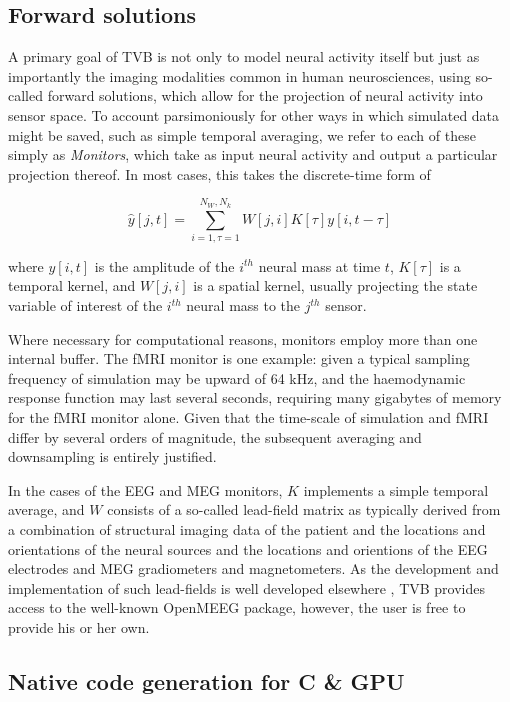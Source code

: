 \subsection{Forward solutions}

    A primary goal of TVB is not only to model neural activity itself
    but just as importantly the imaging modalities common in human 
    neurosciences, using so-called forward solutions, which allow for
    the projection of neural activity into sensor space. To account
    parsimoniously for other ways in which simulated data might be saved, 
    such as simple temporal averaging, we refer to each of these simply as 
    \textit{Monitors}, which take as input neural activity and 
    output a particular projection thereof. In most cases, this 
    takes the discrete-time form of

    \[ \hat{y}[j, t] = \sum_{i=1, \tau=1}^{N_W, N_k} W[j, i] K[\tau] y[i, t-\tau] \]

    \noindent where $y[i, t]$ is the amplitude of the $i^{th}$ neural mass at time
    $t$, $K[\tau]$ is a temporal kernel, and $W[j, i]$ is a spatial kernel,
    usually projecting the state variable of interest of the $i^{th}$ 
    neural mass to the $j^{th}$ sensor. 

    Where necessary for computational reasons, monitors employ more than 
    one internal buffer. The fMRI monitor is one 
    example: given a typical sampling frequency of simulation may be upward of 
    64 kHz, and the haemodynamic response function may last several seconds, 
    requiring many gigabytes of memory for the fMRI monitor alone. Given that 
    the time-scale of simulation and fMRI differ by several orders of magnitude, 
    the subsequent averaging and downsampling is entirely justified. 

    In the cases of the EEG and MEG monitors, $K$ implements a simple
    temporal average, and $W$ consists of a so-called lead-field matrix as typically
    derived from a combination of structural imaging data of the patient 
    and the locations and orientations of the neural sources and the locations
    and orientions of the EEG electrodes and MEG gradiometers and magnetometers. 
    As the development and implementation of such lead-fields is well developed
    elsewhere \cite{Jirsa_2002,Nolte2003,Gramfort_2010}, TVB provides access
    to the well-known OpenMEEG package, however, the user is free to provide 
    his or her own.

\subsection{Native code generation for C \& GPU}


